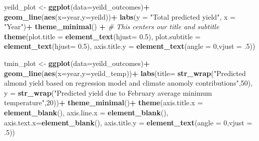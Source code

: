 \documentclass[
]{article}
\newenvironment{Shaded}{\begin{snugshade}}{\end{snugshade}}
\newcommand{\CommentTok}[1]{\textcolor[rgb]{0.56,0.35,0.01}{\textit{#1}}}
\newcommand{\DataTypeTok}[1]{\textcolor[rgb]{0.13,0.29,0.53}{#1}}
\newcommand{\DecValTok}[1]{\textcolor[rgb]{0.00,0.00,0.81}{#1}}
\newcommand{\FloatTok}[1]{\textcolor[rgb]{0.00,0.00,0.81}{#1}}
\newcommand{\KeywordTok}[1]{\textcolor[rgb]{0.13,0.29,0.53}{\textbf{#1}}}
\newcommand{\NormalTok}[1]{#1}
\newcommand{\OperatorTok}[1]{\textcolor[rgb]{0.81,0.36,0.00}{\textbf{#1}}}
\newcommand{\StringTok}[1]{\textcolor[rgb]{0.31,0.60,0.02}{#1}}
\begin{document}
\begin{Shaded}
\begin{Highlighting}[]
\NormalTok{yeild_plot <-}\StringTok{ }\KeywordTok{ggplot}\NormalTok{(}\DataTypeTok{data=}\NormalTok{yeild_outcomes)}\OperatorTok{+}
\StringTok{  }\KeywordTok{geom_line}\NormalTok{(}\KeywordTok{aes}\NormalTok{(}\DataTypeTok{x=}\NormalTok{year,}\DataTypeTok{y=}\NormalTok{yeild))}\OperatorTok{+}
\StringTok{  }\KeywordTok{labs}\NormalTok{(}\DataTypeTok{y =} \StringTok{"Total predicted yield"}\NormalTok{,}
    \DataTypeTok{x =} \StringTok{"Year"}\NormalTok{)}\OperatorTok{+}
\StringTok{    }\KeywordTok{theme_minimal}\NormalTok{() }\OperatorTok{+}\StringTok{  }
\StringTok{    }\CommentTok{# This centers our title and subtitle  }
\StringTok{    }\KeywordTok{theme}\NormalTok{(}\DataTypeTok{plot.title =} \KeywordTok{element_text}\NormalTok{(}\DataTypeTok{hjust=} \FloatTok{0.5}\NormalTok{),}
          \DataTypeTok{plot.subtitle =} \KeywordTok{element_text}\NormalTok{(}\DataTypeTok{hjust=} \FloatTok{0.5}\NormalTok{),}
        \DataTypeTok{axis.title.y =} \KeywordTok{element_text}\NormalTok{(}\DataTypeTok{angle =} \DecValTok{0}\NormalTok{,}\DataTypeTok{vjust =} \FloatTok{.5}\NormalTok{))}
\end{Highlighting}
\end{Shaded}

\begin{Shaded}
\begin{Highlighting}[]
\NormalTok{tmin_plot <-}\StringTok{ }\KeywordTok{ggplot}\NormalTok{(}\DataTypeTok{data=}\NormalTok{yeild_outcomes)}\OperatorTok{+}
\StringTok{  }\KeywordTok{geom_line}\NormalTok{(}\KeywordTok{aes}\NormalTok{(}\DataTypeTok{x=}\NormalTok{year,}\DataTypeTok{y=}\NormalTok{yeild_temp))}\OperatorTok{+}
\StringTok{  }\KeywordTok{labs}\NormalTok{(}\DataTypeTok{title=} \KeywordTok{str_wrap}\NormalTok{(}\StringTok{"Predicted almond yield based on regression model and climate anomoly contributions"}\NormalTok{,}\DecValTok{50}\NormalTok{),}
       \DataTypeTok{y =} \KeywordTok{str_wrap}\NormalTok{(}\StringTok{"Predicted yield due to February average minimum temperature"}\NormalTok{,}\DecValTok{20}\NormalTok{))}\OperatorTok{+}
\StringTok{  }\KeywordTok{theme_minimal}\NormalTok{()}\OperatorTok{+}
\StringTok{  }\KeywordTok{theme}\NormalTok{(}\DataTypeTok{axis.title.x =} \KeywordTok{element_blank}\NormalTok{(),}
        \DataTypeTok{axis.line.x =} \KeywordTok{element_blank}\NormalTok{(),}
        \DataTypeTok{axis.text.x=}\KeywordTok{element_blank}\NormalTok{(),}
        \DataTypeTok{axis.title.y =} \KeywordTok{element_text}\NormalTok{(}\DataTypeTok{angle =} \DecValTok{0}\NormalTok{,}\DataTypeTok{vjust =} \FloatTok{.5}\NormalTok{))}
\end{Highlighting}
\end{Shaded}
\end{document}
